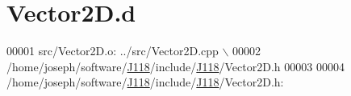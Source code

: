 \hypertarget{_vector2_d_8d_source}{}\section{Vector2\+D.\+d}
\label{_vector2_d_8d_source}

\begin{DoxyCode}
00001 src/Vector2D.o: ../src/Vector2D.cpp \(\backslash\)
00002  /home/joseph/software/\hyperlink{namespace_j118}{J118}/include/\hyperlink{namespace_j118}{J118}/Vector2D.h
00003 
00004 /home/joseph/software/\hyperlink{namespace_j118}{J118}/include/\hyperlink{namespace_j118}{J118}/Vector2D.h:
\end{DoxyCode}
